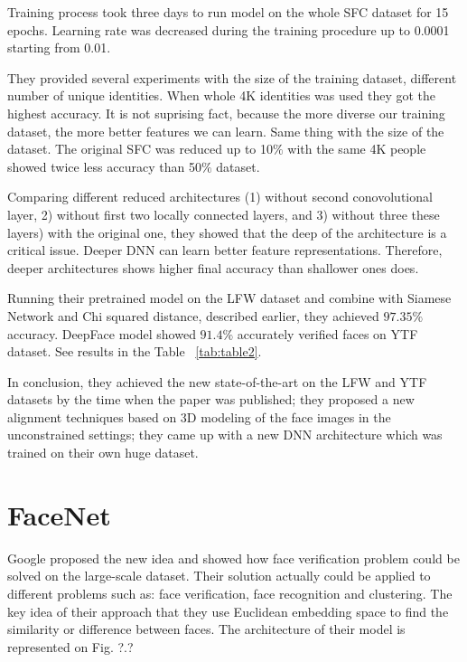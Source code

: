 \documentclass[paper=a4, fontsize=11pt]{scrartcl} %
\numberwithin{equation}{section} %
\numberwithin{figure}{section} %
\numberwithin{table}{section} %
\begin{document}
Training process took three days to run model on the whole SFC dataset for 15 epochs. Learning rate was decreased during the training procedure up to 0.0001 starting from 0.01. \par

They provided several experiments with the size of the training dataset, different number of unique identities. When whole 4K identities was used they got the highest accuracy. It is not suprising fact, because the more diverse our training dataset, the more better features we can learn. Same thing with the size of the dataset. The original SFC was reduced up to 10$\%$ with the same 4K people showed twice less accuracy than 50$\%$ dataset.\par

Comparing different reduced architectures (1) without second conovolutional layer, 2) without first two locally connected layers, and 3) without three these layers) with the original one, they showed that the deep of the architecture is a critical issue. Deeper DNN can learn better feature representations. Therefore, deeper architectures shows higher final accuracy than shallower ones does. \par

Running their pretrained model on the LFW dataset and combine with Siamese Network and Chi squared distance, described earlier, they achieved $97.35\%$ accuracy. DeepFace model showed $91.4\%$ accurately verified faces on YTF dataset. See results in the Table ~\ref{tab:table2}.

In conclusion, they achieved the new state-of-the-art on the LFW and YTF datasets by the time when the paper was published; they proposed a new alignment techniques based on 3D modeling of the face images in the unconstrained settings; they came up with a new DNN architecture which was trained on their own huge dataset.

\section{FaceNet}

Google proposed the new idea \cite{schroff2015facenet} and showed how face verification problem could be solved on the large-scale dataset. Their solution actually could be applied to different problems such as: face verification, face recognition and clustering. The key idea of their approach that they use Euclidean embedding space to find the similarity or difference between faces. The architecture of their model is represented on Fig. ?.?
\end{document}
